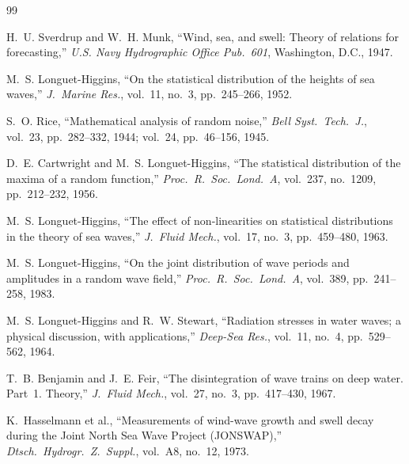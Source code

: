 \documentclass[journal]{IEEEtran}
\begin{document}
    \begin{thebibliography}{99}

        H.~U. Sverdrup and W.~H. Munk,
        ``Wind, sea, and swell: Theory of relations for forecasting,''
        \emph{U.S. Navy Hydrographic Office Pub.\ 601}, Washington, D.C., 1947.

        M.~S. Longuet-Higgins,
        ``On the statistical distribution of the heights of sea waves,''
        \emph{J.\ Marine Res.}, vol.~11, no.~3, pp.~245--266, 1952.

        S.~O. Rice,
        ``Mathematical analysis of random noise,''
        \emph{Bell Syst.\ Tech.\ J.}, vol.~23, pp.~282--332, 1944;
        vol.~24, pp.~46--156, 1945.

        D.~E. Cartwright and M.~S. Longuet-Higgins,
        ``The statistical distribution of the maxima of a random function,''
        \emph{Proc.\ R.\ Soc.\ Lond.\ A}, vol.~237, no.~1209,
        pp.~212--232, 1956.

        M.~S. Longuet-Higgins,
        ``The effect of non-linearities on statistical distributions
        in the theory of sea waves,''
        \emph{J.\ Fluid Mech.}, vol.~17, no.~3, pp.~459--480, 1963.

        M.~S. Longuet-Higgins,
        ``On the joint distribution of wave periods and amplitudes in a
        random wave field,''
        \emph{Proc.\ R.\ Soc.\ Lond.\ A}, vol.~389, pp.~241--258, 1983.

        M.~S. Longuet-Higgins and R.~W. Stewart,
        ``Radiation stresses in water waves; a physical discussion,
        with applications,''
        \emph{Deep-Sea Res.}, vol.~11, no.~4, pp.~529--562, 1964.

        T.~B. Benjamin and J.~E. Feir,
        ``The disintegration of wave trains on deep water.
        Part~1. Theory,''
        \emph{J.\ Fluid Mech.}, vol.~27, no.~3, pp.~417--430, 1967.

        K.~Hasselmann et al.,
        ``Measurements of wind-wave growth and swell decay during the Joint
        North Sea Wave Project (JONSWAP),''
        \emph{Dtsch.\ Hydrogr.\ Z.\ Suppl.}, vol.~A8, no.~12, 1973.


\end{thebibliography}
\end{document}
